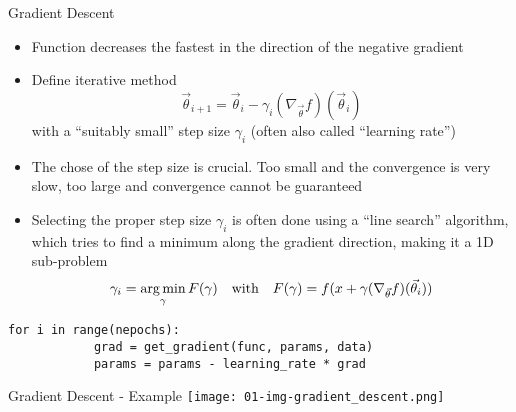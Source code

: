   \begin{frame}[fragile]{Gradient Descent}
    \begin{itemize}
      \item Function decreases the fastest in the direction of the negative gradient
      \item Define iterative method
        \begin{equation*}
          \vec{\theta}_{i+1}
          = \vec{\theta}_i - \gamma_i (\nabla_{\vec{\theta}}f)(\vec{\theta}_i)
        \end{equation*}
        with a \enquote{suitably small} step size $\gamma_i$ (often also called \enquote{learning rate})
      \item The chose of the step size is crucial. Too small and the convergence is very slow, too large and convergence cannot be guaranteed
      \item Selecting the proper step size $\gamma_i$ is often done using a \enquote{line search} algorithm, which tries to find a minimum along the gradient direction, making it a 1D sub-problem
      \begin{equation*}
        \gamma_i = \operatorname*{arg\,min}_\gamma F(\gamma) \quad\text{with}\quad
        F(\gamma) = f(x + \gamma (\nabla_{\vec{\theta}}f)(\vec{\theta}_i))
      \end{equation*}
    \end{itemize}
    \begin{mdframed}
      \begin{lstlisting}[style=dark, gobble=6, title=\lsttitlelight{Example Implementation}]
        for i in range(nepochs):
            grad = get_gradient(func, params, data)
            params = params - learning_rate * grad
      \end{lstlisting}
    \end{mdframed}
  \end{frame}

  \begin{frame}{Gradient Descent - Example}
    \texttt{[image: 01-img-gradient\_descent.png]}
  \end{frame}


